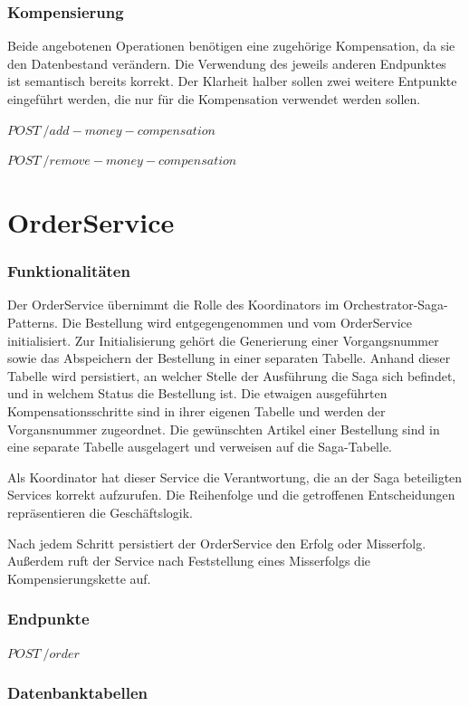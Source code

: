 \subsubsection{Kompensierung}
Beide angebotenen Operationen benötigen eine zugehörige Kompensation, da sie den Datenbestand verändern. Die Verwendung des jeweils anderen Endpunktes ist semantisch bereits korrekt. Der Klarheit halber sollen zwei weitere Entpunkte eingeführt werden, die nur für die Kompensation verwendet werden sollen.

$POST \ /add-money-compensation$

$POST \ /remove-money-compensation$

\section{OrderService}
\subsubsection{Funktionalitäten}
Der OrderService übernimmt die Rolle des Koordinators im Orchestrator-Saga-Patterns. Die Bestellung wird entgegengenommen und vom OrderService initialisiert. Zur Initialisierung gehört die Generierung einer Vorgangsnummer sowie das Abspeichern der Bestellung in einer separaten Tabelle. Anhand dieser Tabelle wird persistiert, an welcher Stelle der Ausführung die Saga sich befindet, und in welchem Status die Bestellung ist. Die etwaigen ausgeführten Kompensationsschritte sind in ihrer eigenen Tabelle und werden der Vorgansnummer zugeordnet. Die gewünschten Artikel einer Bestellung sind in eine separate Tabelle ausgelagert und verweisen auf die Saga-Tabelle. 

Als Koordinator hat dieser Service die Verantwortung, die an der Saga beteiligten Services korrekt aufzurufen. Die Reihenfolge und die getroffenen Entscheidungen repräsentieren die Geschäftslogik. 

Nach jedem Schritt persistiert der OrderService den Erfolg oder Misserfolg. Außerdem ruft der Service nach Feststellung eines Misserfolgs die Kompensierungskette auf. 

\subsubsection{Endpunkte}
$POST \ /order$

\subsubsection{Datenbanktabellen}

